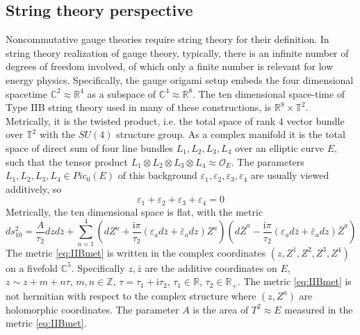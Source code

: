 \documentclass[12pt]{article}
\numberwithin{equation}{section}
\newcommand{\ve}{{\varepsilon}}
\newcommand\beq{\begin{equation}}
\newcommand\eeq{\end{equation}}
\theoremstyle{definition}
\newcommand {\BC}   {\mathbb C}
\newcommand {\BR}   {\mathbb R}
\newcommand {\BT}   {\mathbb T}
\newcommand {\BZ}   {\mathbb Z}
\newcommand {\CalO} {\mathcal O}
\newcommand {\ii} {\mathrm{i}}
\begin{document}
\subsection{String theory perspective}
Noncommutative gauge theories \cite{Douglas:2001ba} require string theory for their definition. 
In string theory realization of gauge theory, typically, there is an infinite number of degrees of freedom involved, of which only a finite number is relevant for low energy physics. 
Specifically, the gauge origami \cite{Nekrasov:2016ydq} setup embeds the four dimensional 
spacetime ${\BC}^{2} \approx {\BR}^{4}$ as a subspace of ${\BC}^{4} \approx {\BR}^{8}$. The ten dimensional space-time of Type IIB string theory used in many of these constructions, is ${\BR}^{8} \times {\BT}^{2}$. Metrically, it is the twisted product, i.e.
the total space of rank $4$ vector bundle over ${\BT}^{2}$ with the $SU(4)$ structure group. 
As a complex manifold it is the total space of direct sum of four line bundles
$L_1, L_2, L_3, L_4$ over an elliptic curve $E$, such that the tensor product
$L_1 \otimes L_2 \otimes L_3 \otimes L_4 \approx {\CalO}_{E}$. The parameters $L_1, L_2, L_3, L_4 \in Pic_{0}(E)$ of this background
${\ve}_{1}, {\ve}_{2}, {\ve}_{3}, {\ve}_{4}$ are usually viewed additively, so
\beq
{\ve}_{1} + {\ve}_{2} + {\ve}_{3} + {\ve}_{4} = 0
\eeq
Metrically, the ten dimensional space is flat, with the metric
\beq
ds^{2}_{10} = \frac{A}{\tau_2} dzd{\bar z} + \sum_{a=1}^{4} \left( dZ^a + \frac{\ii\pi}{\tau_2} \left( {\ve}_{a} d{\bar z} + {\bar\ve}_{a} dz \right) Z^a \right) \left( d{\bar Z}^a -\frac{\ii\pi}{\tau_2} \left( {\ve}_{a} d{\bar z} + {\bar\ve}_{a} dz \right) {\bar Z}^a   \right)
\label{eq:IIBmet}
\eeq
The metric \eqref{eq:IIBmet} is written in the complex coordinates $(z, Z^1, Z^2, Z^3, Z^4)$
on a fivefold ${\BC}^{5}$. 
Specifically $z, {\bar z}$ are the additive coordinates on $E$, $z \sim z+ m + n {\tau}$, $m,n \in {\BZ}$, ${\tau} = {\tau}_{1} + {\ii} {\tau}_{2}$, ${\tau}_{1} \in {\BR}$, ${\tau}_{2} \in {\BR}_{+}$. 
The metric \eqref{eq:IIBmet} is not hermitian with respect to the complex structure where
$(z, Z^a)$ are holomorphic coordinates. The parameter $A$  is the area of $T^2  \approx E$ measured in the metric \eqref{eq:IIBmet}. 
\end{document}
